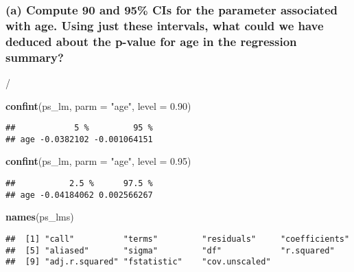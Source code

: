 \documentclass[
]{article}
\newenvironment{Shaded}{\begin{snugshade}}{\end{snugshade}}
\newcommand{\DataTypeTok}[1]{\textcolor[rgb]{0.13,0.29,0.53}{#1}}
\newcommand{\FloatTok}[1]{\textcolor[rgb]{0.00,0.00,0.81}{#1}}
\newcommand{\KeywordTok}[1]{\textcolor[rgb]{0.13,0.29,0.53}{\textbf{#1}}}
\newcommand{\NormalTok}[1]{#1}
\newcommand{\StringTok}[1]{\textcolor[rgb]{0.31,0.60,0.02}{#1}}
\begin{document}
\hypertarget{a-compute-90-and-95-cis-for-the-parameter-associated-with-age.-using-just-these-intervals-what-could-we-have-deduced-about-the-p-value-for-age-in-the-regression-summary}{%
\subsubsection{(a) Compute 90 and 95\% CIs for the parameter associated
with age. Using just these intervals, what could we have deduced about
the p-value for age in the regression
summary?}\label{a-compute-90-and-95-cis-for-the-parameter-associated-with-age.-using-just-these-intervals-what-could-we-have-deduced-about-the-p-value-for-age-in-the-regression-summary}}

/

\begin{Shaded}
\begin{Highlighting}[]
\KeywordTok{confint}\NormalTok{(ps_lm, }\DataTypeTok{parm =} \StringTok{"age"}\NormalTok{, }\DataTypeTok{level =} \FloatTok{0.90}\NormalTok{)}
\end{Highlighting}
\end{Shaded}

\begin{verbatim}
##            5 %         95 %
## age -0.0382102 -0.001064151
\end{verbatim}

\begin{Shaded}
\begin{Highlighting}[]
\KeywordTok{confint}\NormalTok{(ps_lm, }\DataTypeTok{parm =} \StringTok{"age"}\NormalTok{, }\DataTypeTok{level =} \FloatTok{0.95}\NormalTok{)}
\end{Highlighting}
\end{Shaded}

\begin{verbatim}
##           2.5 %      97.5 %
## age -0.04184062 0.002566267
\end{verbatim}

\begin{Shaded}
\begin{Highlighting}[]
\KeywordTok{names}\NormalTok{(ps_lms)}
\end{Highlighting}
\end{Shaded}

\begin{verbatim}
##  [1] "call"          "terms"         "residuals"     "coefficients" 
##  [5] "aliased"       "sigma"         "df"            "r.squared"    
##  [9] "adj.r.squared" "fstatistic"    "cov.unscaled"
\end{verbatim}
\end{document}

